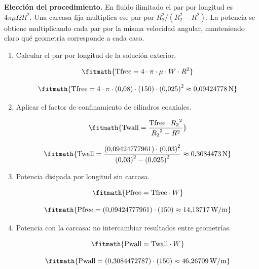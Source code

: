 \noindent\textbf{Elección del procedimiento.} En fluido ilimitado el par por longitud es $4\pi\mu\Omega R^2$. Una carcasa fija multiplica ese par por $R_2^2/(R_2^2-R^2)$. La potencia se obtiene multiplicando cada par por la misma velocidad angular, manteniendo claro qué geometría corresponde a cada caso.

\begin{enumerate}

\item Calcular el par por longitud de la solución exterior.

\[\fitmath{\mathrm{Tfree}=4\cdot \pi\cdot \mu\cdot W\cdot {R}^{2}}\]

\[\fitmath{\mathrm{Tfree}=4\cdot \pi\cdot (0{,}08)\cdot (150)\cdot {(0{,}025)}^{2}\approx 0{,}09424778\,\mathrm{N}}\]

\item Aplicar el factor de confinamiento de cilindros coaxiales.

\[\fitmath{\mathrm{Twall}=\frac{\mathrm{Tfree}\cdot {R_{2}}^{2}}{{R_{2}}^{2}-{R}^{2}}}\]

\[\fitmath{\mathrm{Twall}=\frac{(0{,}09424777961)\cdot {(0{,}03)}^{2}}{{(0{,}03)}^{2}-{(0{,}025)}^{2}}\approx 0{,}3084473\,\mathrm{N}}\]

\item Potencia disipada por longitud sin carcasa.

\[\fitmath{\mathrm{Pfree}=\mathrm{Tfree}\cdot W}\]

\[\fitmath{\mathrm{Pfree}=(0{,}09424777961)\cdot (150)\approx 14{,}13717\,\mathrm{W/m}}\]

\item Potencia con la carcasa: no intercambiar resultados entre geometrías.

\[\fitmath{\mathrm{Pwall}=\mathrm{Twall}\cdot W}\]

\[\fitmath{\mathrm{Pwall}=(0{,}3084472787)\cdot (150)\approx 46{,}26709\,\mathrm{W/m}}\]

\end{enumerate}
